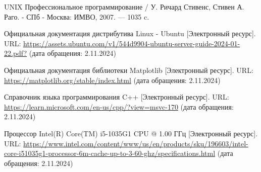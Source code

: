 \renewcommand\bibname{\hfill\parbox{\dimexpr\textwidth-2cm}{\centering\Large СПИСОК ИСПОЛЬЗОВАННЫХ ИСТОЧНИКОВ}\hfill}

\begin{thebibliography}{9}
	
	 UNIX Профессиональное программирование / У. Ричард Стивенс, Стивен А. Раго. - СПб - Москва: ИМВО, 2007. --- 1035 c.
	
	 Официальная документация дистрибутива Linux - Ubuntu [Электронный ресурс]. URL: \url{https://assets.ubuntu.com/v1/544d9904-ubuntu-server-guide-2024-01-22.pdf?} (дата обращения: 2.11.2024)
	
	 Официальная документация библиотеки Matplotlib [Электронный ресурс]. URL: \url{https://matplotlib.org/stable/index.html} (дата обращения: 2.11.2024)
	
	 Справочник языка программирования C++ [Электронный ресурс]. URL: \url{https://learn.microsoft.com/en-us/cpp/?view=msvc-170} (дата обращения: 2.11.2024)
	
	 Процессор Intel(R) Core(TM) i5-1035G1 CPU @ 1.00 ГГц [Электронный ресурс]. URL: \url{https://www.intel.com/content/www/us/en/products/sku/196603/intel-core-i51035g1-processor-6m-cache-up-to-3-60-ghz/specifications.html} (дата обращения: 2.11.2024)
	
\end{thebibliography}
